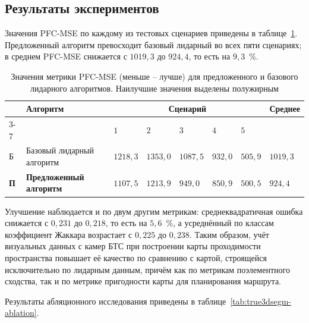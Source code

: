 \subsection{Результаты экспериментов}

Значения PFC-MSE по каждому из тестовых сценариев приведены в таблице~\cref{tab:true3dsegm-main}. Предложенный алгоритм превосходит базовый лидарный во всех пяти сценариях; в среднем PFC-MSE снижается с $1019,3$ до $924,4$, то есть на $9,3$~\%.

\begin{table}[htbp]
	\small
	\centering
	\begin{tabular}{|p{}|p{}|p{}|p{}|p{}|p{}|p{}|p{}|}
		\hline
		& \textbf{Алгоритм} & \multicolumn{5}{c|}{\textbf{Сценарий}} & \textbf{Среднее} \\
		\cline{3-7}
		& & $1$ & $2$ & $3$ & $4$ & $5$ & \\
		\hline
		Б & Базовый лидарный алгоритм & $1218,3$ & $1353,0$ & $1087,5$ & $932,0$ & $505,9$ & $1019,3$ \\
		\hline
		\textbf{П} & \textbf{Предложенный алгоритм} & \boldmath$1107,5$ & \boldmath$1213,9$ & \boldmath$949,0$ & \boldmath$850,9$ & \boldmath$500,5$ & \boldmath$924,4$ \\
		\hline
	\end{tabular}
	\caption{Значения метрики PFC-MSE (меньше -- лучше) для предложенного и базового лидарного алгоритмов. Наилучшие значения выделены полужирным}
	\label{tab:true3dsegm-main}
\end{table}

Улучшение наблюдается и по двум другим метрикам: среднеквадратичная ошибка снижается с $0,231$ до $0,218$, то есть на $5,6$~\%, а усреднённый по классам коэффициент Жаккара возрастает с $0,225$ до $0,238$. Таким образом, учёт визуальных данных с камер БТС при построении карты проходимости пространства повышает её качество по сравнению с картой, строящейся исключительно по лидарным данным, причём как по метрикам поэлементного сходства, так и по метрике пригодности карты для планирования маршрута.

Результаты абляционного исследования приведены в таблице~\cref{tab:true3dsegm-ablation}.

